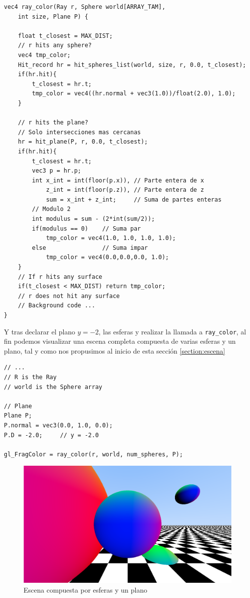 \begin{lstlisting}
vec4 ray_color(Ray r, Sphere world[ARRAY_TAM], 
    int size, Plane P) {
    
    float t_closest = MAX_DIST;   
    // r hits any sphere?
    vec4 tmp_color;
    Hit_record hr = hit_spheres_list(world, size, r, 0.0, t_closest);
    if(hr.hit){
        t_closest = hr.t;
        tmp_color = vec4((hr.normal + vec3(1.0))/float(2.0), 1.0);
    }

    // r hits the plane? 
    // Solo intersecciones mas cercanas
    hr = hit_plane(P, r, 0.0, t_closest);
    if(hr.hit){
        t_closest = hr.t;
        vec3 p = hr.p;
        int x_int = int(floor(p.x)), // Parte entera de x
            z_int = int(floor(p.z)), // Parte entera de z
            sum = x_int + z_int;     // Suma de partes enteras
        // Modulo 2
        int modulus = sum - (2*int(sum/2));
        if(modulus == 0)    // Suma par
            tmp_color = vec4(1.0, 1.0, 1.0, 1.0);
        else                // Suma impar
            tmp_color = vec4(0.0,0.0,0.0, 1.0);
    }
    // If r hits any surface
    if(t_closest < MAX_DIST) return tmp_color;
    // r does not hit any surface
    // Background code ... 
}
\end{lstlisting}

Y tras declarar el plano $y=-2$, las esferas y realizar la llamada a \verb|ray_color|, al fin podemos visualizar una escena completa compuesta de varias esferas y un plano, tal y como nos propusimos al inicio de esta sección \ref{section:escena}

\begin{lstlisting}
// ... 
// R is the Ray
// world is the Sphere array

// Plane
Plane P;
P.normal = vec3(0.0, 1.0, 0.0);
P.D = -2.0;     // y = -2.0

gl_FragColor = ray_color(r, world, num_spheres, P);
\end{lstlisting}

\begin{figure} [ht]
    \centering
    \includegraphics[scale = 0.25]{img/C7/escena-completa.png}
    \caption{Escena compuesta por esferas y un plano}
    \label{fig:escena-completa}
\end{figure}

